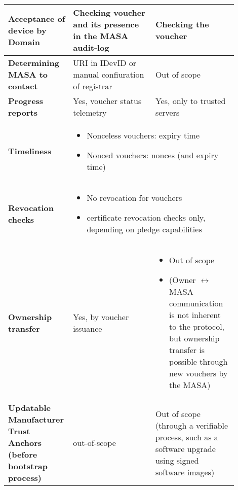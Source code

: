 \begin{longtable}{|p{0.2\linewidth}|p{0.35\linewidth}|p{0.35\linewidth}|}
		\hline
		\cellcolor[rgb]{ .745, .804, .843}\textbf{Acceptance of device by Domain} & Checking voucher and its presence in the MASA audit-log & Checking the voucher \\

		\hline
		\cellcolor[rgb]{ .745, .804, .843}\textbf{Determining MASA to contact} & URI in IDevID or manual confiuration of registrar & Out of scope \\

		\hline
		\cellcolor[rgb]{ .745, .804, .843}\textbf{Progress reports} & Yes, voucher status telemetry & Yes, only to trusted servers \\

		\hline
		\cellcolor[rgb]{ .745, .804, .843}\textbf{Timeliness} & \multicolumn{2}{p{36.67em}|}{ 
		\begin{itemize}[leftmargin=*, topsep=0pt, noitemsep]
		\item
			Nonceless vouchers: expiry time
		\item
			Nonced vouchers: nonces (and expiry time)
		\end{itemize}
		} \\

		\hline
		\cellcolor[rgb]{ .745, .804, .843}\textbf{Revocation checks} & \multicolumn{2}{p{36.67em}|}{ 
		\begin{itemize}[leftmargin=*, topsep=0pt, noitemsep]
		\item
			No revocation for vouchers
		\item
			certificate revocation checks only, depending on pledge capabilities
		\end{itemize}
		 } \\

		\hline
		\cellcolor[rgb]{ .745, .804, .843}\textbf{Ownership transfer} & Yes, by voucher issuance &
		\begin{itemize}[leftmargin=*, topsep=0pt, noitemsep]
		\item Out of scope
		\item (Owner $ \leftrightarrow $ MASA communication is not inherent to the protocol, but ownership transfer is possible through new vouchers by the MASA)
		\end{itemize}
		 \\

		\hline
		\cellcolor[rgb]{ .745, .804, .843}\textbf{Updatable Manufacturer Trust Anchors (before bootstrap process)} & out-of-scope & Out of scope (through a verifiable process, such as a software upgrade using signed software images) \\


\end{longtable}

